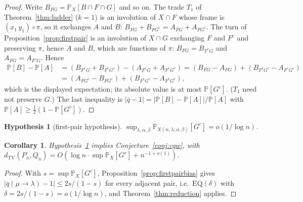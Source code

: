 \documentclass[11pt]{article}
\newtheorem{corollary}[theorem]{Corollary}
\newtheorem{hypothesis}[theorem]{Hypothesis}
\theoremstyle{definition}
\newcommand{\dtv}{d_{\mathrm{TV}}}
\renewcommand{\Pr}{\mathbb{P}}
\newcommand{\PP}{P}
\newcommand{\QQ}{Q}
\begin{document}
\begin{proof}
Write $B_{FG}=\Pr_X[B\cap F\cap G]$ and so on.  The trade $T_1$ of
Theorem~\ref{thm:ladder} ($k=1$) is an involution of $X\cap F$ whose frame is
$(x_1\,y_1)\circ\pi$, so it exchanges $A$ and $B$:
$B_{FG}+B_{FG^c}=A_{FG}+A_{FG^c}$.  The turn of Proposition~\ref{prop:firstpair} is an
involution of $X\cap G$ exchanging $F$ and $F^c$ and preserving $\pi$, hence $A$ and $B$,
which are functions of $\pi$: $B_{FG}=B_{F^cG}$ and $A_{FG}=A_{F^cG}$.  Hence
\begin{align*}
\Pr[B]-\Pr[A]&=(B_{F^cG}+B_{F^cG^c})-(A_{F^cG}+A_{F^cG^c})
=(B_{FG}-A_{FG})+(B_{F^cG^c}-A_{F^cG^c})\\
&=(A_{FG^c}-B_{FG^c})+(B_{F^cG^c}-A_{F^cG^c}),
\end{align*}
which is the displayed expectation; its absolute value is at most $\Pr[G^c]$.  ($T_1$ need
not preserve $G$.)  The last inequality is $|\bar q-1|=|\Pr[B]-\Pr[A]|/\Pr[A]$ with
$\Pr[A]\ge\tfrac12(1-\Pr[G^c])$.
\end{proof}

\begin{hypothesis}[first-pair hypothesis]\label{hyp:firstpair}
$\displaystyle\sup_{\lambda,\alpha,\beta}\Pr_{X(n,\lambda;\alpha,\beta)}[G^c]=o(1/\log n)$.
\end{hypothesis}

\begin{corollary}\label{cor:firstpair}
Hypothesis~\ref{hyp:firstpair} implies Conjecture~\ref{conj:cgw}, with
$\dtv(\PP_n,\QQ_n)=O(\log n\cdot\sup\Pr_X[G^c]+n^{-1+o(1)})$.
\end{corollary}
\begin{proof}
With $s=\sup\Pr_X[G^c]$, Proposition~\ref{prop:firstpairbias} gives
$|\bar q(\mu\to\lambda)-1|\le2s/(1-s)$ for every adjacent pair, i.e.\ $\mathrm{EQ}(\delta)$
with $\delta=2s/(1-s)=o(1/\log n)$, and Theorem~\ref{thm:reduction} applies.
\end{proof}
\end{document}

